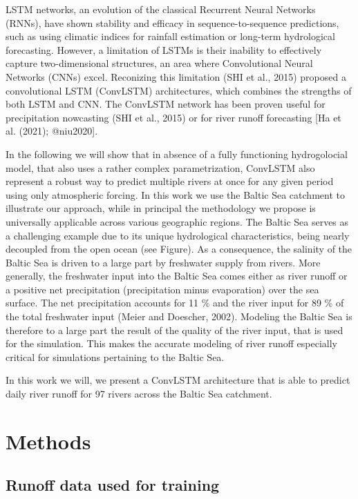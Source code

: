 \documentclass[
]{agujournal2019}
\begin{document}
LSTM networks, an evolution of the classical Recurrent Neural Networks
(RNNs), have shown stability and efficacy in sequence-to-sequence
predictions, such as using climatic indices for rainfall estimation or
long-term hydrological forecasting. However, a limitation of LSTMs is
their inability to effectively capture two-dimensional structures, an
area where Convolutional Neural Networks (CNNs) excel. Reconizing this
limitation (SHI et al., 2015) proposed a convolutional LSTM (ConvLSTM)
architectures, which combines the strengths of both LSTM and CNN. The
ConvLSTM network has been proven useful for precipitation nowcasting
(SHI et al., 2015) or for river runoff forecasting {[}Ha et al. (2021);
@niu2020{]}.

In the following we will show that in absence of a fully functioning
hydrogolocial model, that also uses a rather complex parametrization,
ConvLSTM also represent a robust way to predict multiple rivers at once
for any given period using only atmospheric forcing. In this work we use
the Baltic Sea catchment to illustrate our approach, while in principal
the methodology we propose is universally applicable across various
geographic regions. The Baltic Sea serves as a challenging example due
to its unique hydrological characteristics, being nearly decoupled from
the open ocean (see Figure). As a consequence, the salinity of the
Baltic Sea is driven to a large part by freshwater supply from rivers.
More generally, the freshwater input into the Baltic Sea comes either as
river runoff or a positive net precipitation (precipitation minus
evaporation) over the sea surface. The net precipitation accounts for 11
\% and the river input for 89 \% of the total freshwater input (Meier
and Doescher, 2002). Modeling the Baltic Sea is therefore to a large
part the result of the quality of the river input, that is used for the
simulation. This makes the accurate modeling of river runoff especially
critical for simulations pertaining to the Baltic Sea.

In this work we will, we present a ConvLSTM architecture that is able to
predict daily river runoff for 97 rivers across the Baltic Sea
catchment.

\hypertarget{methods}{%
\section{Methods}\label{methods}}

\hypertarget{runoff-data-used-for-training}{%
\subsection{Runoff data used for
training}\label{runoff-data-used-for-training}}
\end{document}
